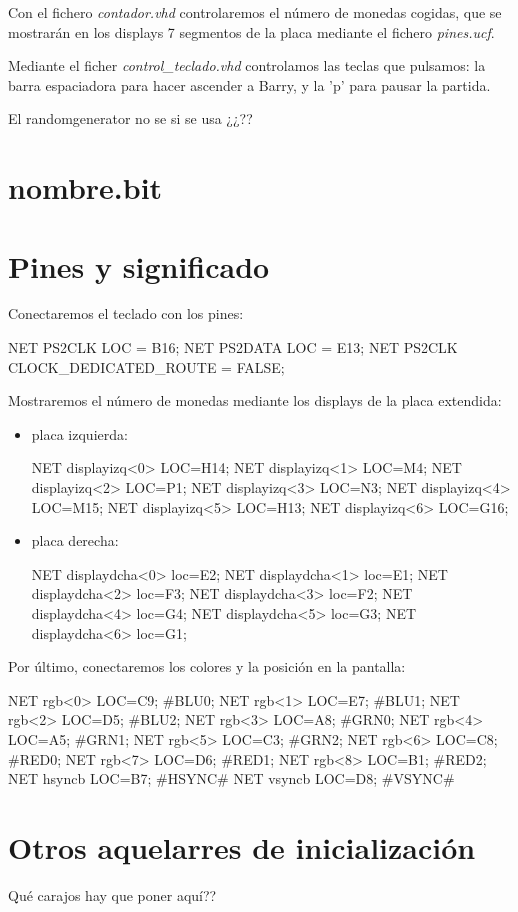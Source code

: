 \documentclass[11pt, a4paper, spanish, openright, twoside]{book}
\begin{document}
Con el fichero \textit{contador.vhd} controlaremos el número de monedas cogidas, que se mostrarán en los displays 7 segmentos de la placa mediante el fichero \textit{pines.ucf}.

Mediante el ficher \textit{control_teclado.vhd} controlamos las teclas que pulsamos: la barra espaciadora para hacer ascender a Barry, y la 'p' para pausar la partida.

El randomgenerator no se si se usa ¿¿??


\section{nombre.bit}


\section{Pines y significado}
Conectaremos el teclado con los pines:

NET PS2CLK LOC = B16;
NET PS2DATA LOC = E13;
NET PS2CLK CLOCK_DEDICATED_ROUTE = FALSE;

Mostraremos el número de monedas mediante los displays de la placa extendida:
\begin{itemize}
\item placa izquierda:

NET displayizq<0> LOC=H14;
NET displayizq<1> LOC=M4;
NET displayizq<2> LOC=P1;
NET displayizq<3> LOC=N3;
NET displayizq<4> LOC=M15;
NET displayizq<5> LOC=H13;
NET displayizq<6> LOC=G16;

\item placa derecha:

NET displaydcha<0> loc=E2;
NET displaydcha<1> loc=E1;
NET displaydcha<2> loc=F3;
NET displaydcha<3> loc=F2;
NET displaydcha<4> loc=G4;
NET displaydcha<5> loc=G3;
NET displaydcha<6> loc=G1;
\end{itemize}

Por último, conectaremos los colores y la posición en la pantalla:

NET rgb<0> LOC=C9; #BLU0;
NET rgb<1> LOC=E7; #BLU1;
NET rgb<2> LOC=D5; #BLU2;
NET rgb<3> LOC=A8; #GRN0; 
NET rgb<4> LOC=A5; #GRN1;
NET rgb<5> LOC=C3; #GRN2;
NET rgb<6> LOC=C8; #RED0;
NET rgb<7> LOC=D6; #RED1;
NET rgb<8> LOC=B1; #RED2;
NET hsyncb LOC=B7; #HSYNC# 
NET vsyncb LOC=D8; #VSYNC# 

\section{Otros aquelarres de inicialización}
Qué carajos hay que poner aquí??
\end{document}
